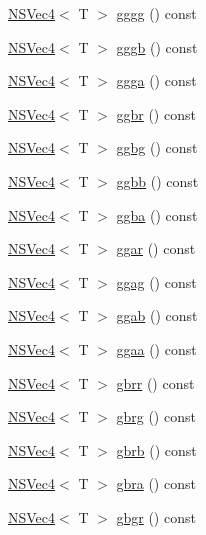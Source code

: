 \begin{DoxyCompactItemize}
\item 
\hyperlink{structNSVec4}{N\-S\-Vec4}$<$ T $>$ \hyperlink{structNSVec4_aa0a69e00d5725ff622bf781bfb1b868b}{gggg} () const 
\item 
\hyperlink{structNSVec4}{N\-S\-Vec4}$<$ T $>$ \hyperlink{structNSVec4_adde99871a9f39ddd3f8bec1a256ed8af}{gggb} () const 
\item 
\hyperlink{structNSVec4}{N\-S\-Vec4}$<$ T $>$ \hyperlink{structNSVec4_a805cd094b6a0a6587ac7b704b5e67dc8}{ggga} () const 
\item 
\hyperlink{structNSVec4}{N\-S\-Vec4}$<$ T $>$ \hyperlink{structNSVec4_a9f82a3ac611357dc730936171ad6214f}{ggbr} () const 
\item 
\hyperlink{structNSVec4}{N\-S\-Vec4}$<$ T $>$ \hyperlink{structNSVec4_a0838ed9c06b477d447a5afc425dd21d2}{ggbg} () const 
\item 
\hyperlink{structNSVec4}{N\-S\-Vec4}$<$ T $>$ \hyperlink{structNSVec4_aef8866b4850b4e0430751af76635f916}{ggbb} () const 
\item 
\hyperlink{structNSVec4}{N\-S\-Vec4}$<$ T $>$ \hyperlink{structNSVec4_a9bfe2208cd51948701147a7753df5cfa}{ggba} () const 
\item 
\hyperlink{structNSVec4}{N\-S\-Vec4}$<$ T $>$ \hyperlink{structNSVec4_a98832185af9788dee582902c3cef5c35}{ggar} () const 
\item 
\hyperlink{structNSVec4}{N\-S\-Vec4}$<$ T $>$ \hyperlink{structNSVec4_a080e4343e679808778219cd512a7c7cb}{ggag} () const 
\item 
\hyperlink{structNSVec4}{N\-S\-Vec4}$<$ T $>$ \hyperlink{structNSVec4_a51d3e298f7158c908a97ebeda337d3f3}{ggab} () const 
\item 
\hyperlink{structNSVec4}{N\-S\-Vec4}$<$ T $>$ \hyperlink{structNSVec4_a8f168f16b1ee6ce8f21b4ae91fda511e}{ggaa} () const 
\item 
\hyperlink{structNSVec4}{N\-S\-Vec4}$<$ T $>$ \hyperlink{structNSVec4_aa69921ec813f862cd32e8d6e9ca71d23}{gbrr} () const 
\item 
\hyperlink{structNSVec4}{N\-S\-Vec4}$<$ T $>$ \hyperlink{structNSVec4_adc68fbcf948b6b93d452098674692ea0}{gbrg} () const 
\item 
\hyperlink{structNSVec4}{N\-S\-Vec4}$<$ T $>$ \hyperlink{structNSVec4_a312f2e3b279bee3910affb9e0015a255}{gbrb} () const 
\item 
\hyperlink{structNSVec4}{N\-S\-Vec4}$<$ T $>$ \hyperlink{structNSVec4_a03620301039d4d71ed9b761614684622}{gbra} () const 
\item 
\hyperlink{structNSVec4}{N\-S\-Vec4}$<$ T $>$ \hyperlink{structNSVec4_a42f23c109ea000bcba8f60f026d2b16a}{gbgr} () const 

\end{DoxyCompactItemize}
